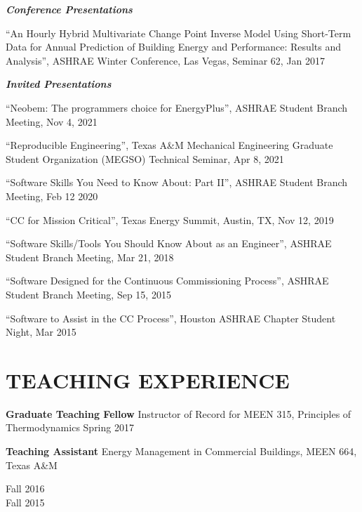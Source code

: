 \documentclass[margin]{res} %
\begin{document}
\begin{resume}

\textbf{\textit{Conference Presentations}}

``An Hourly Hybrid Multivariate Change Point Inverse  Model Using Short-Term Data for Annual Prediction of Building Energy and Performance: Results and Analysis'', ASHRAE Winter Conference, Las Vegas, Seminar 62, Jan 2017

\textbf{\textit{Invited Presentations}}

``Neobem: The programmers choice for EnergyPlus'', ASHRAE Student Branch Meeting, Nov 4, 2021

``Reproducible Engineering'', Texas A\&M Mechanical Engineering Graduate
Student Organization (MEGSO) Technical Seminar, Apr 8, 2021

``Software Skills You Need to Know About: Part II'', ASHRAE Student Branch Meeting, Feb 12 2020

``CC\textsuperscript{\textregistered{}} for Mission Critical'', Texas Energy Summit, Austin, TX, Nov 12, 2019

``Software Skills/Tools You Should Know About as an Engineer'', ASHRAE Student Branch Meeting, Mar 21, 2018

``Software Designed for the Continuous Commissioning Process'', ASHRAE Student Branch Meeting, Sep 15, 2015

``Software to Assist in the CC Process'', Houston ASHRAE Chapter Student Night, Mar 2015


\section{TEACHING EXPERIENCE}
\textbf{Graduate Teaching Fellow} \newline
Instructor of Record for MEEN 315, Principles of Thermodynamics \hfill Spring 2017

\textbf{Teaching Assistant}\newline
Energy Management in Commercial Buildings, MEEN 664, Texas A\&M \hfill \parbox[t]{1.5cm}{\raggedleft Fall 2016 \\ Fall 2015} \par


\end{resume}
\end{document}
